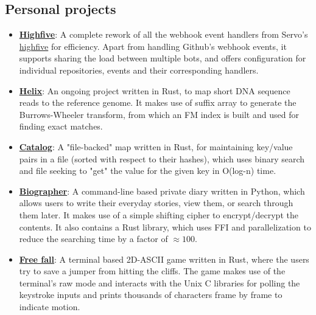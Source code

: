 \documentclass[11pt,a4paper,sans]{moderncv}        %
\newcommand\chref[3][linky]{\href{#2}{\color{#1}#3}}
\begin{document}
\subsection{Personal projects}
\begin{itemize}
\item \textbf{\chref{https://github.com/servo-automation/highfive}{Highfive}}: A complete rework of all the webhook event handlers from Servo's \chref{https://github.com/servo/highfive}{highfive} for efficiency. Apart from handling Github's webhook events, it supports sharing the load between multiple bots, and offers configuration for individual repositories, events and their corresponding handlers.
\item \textbf{\chref{https://github.com/Wafflespeanut/rust-helix}{Helix}}: An ongoing project written in Rust, to map short DNA sequence reads to the reference genome. It makes use of suffix array to generate the Burrows-Wheeler transform, from which an FM index is built and used for finding exact matches.
\item \textbf{\chref{https://github.com/Wafflespeanut/rust-catalog}{Catalog}}: A "file-backed" map written in Rust, for maintaining key/value pairs in a file (sorted with respect to their hashes), which uses binary search and file seeking to "get" the value for the given key in O(log-n) time.
\item \textbf{\chref{https://github.com/Wafflespeanut/biographer}{Biographer}}: A command-line based private diary written in Python, which allows users to write their everyday stories, view them, or search through them later. It makes use of a simple shifting cipher to encrypt/decrypt the contents. It also contains a Rust library, which uses FFI and parallelization to reduce the searching time by a factor of $\approx 100$.
\item \textbf{\chref{https://github.com/Wafflespeanut/free-fall}{Free fall}}: A terminal based 2D-ASCII game written in Rust, where the users try to save a jumper from hitting the cliffs. The game makes use of the terminal's raw mode and interacts with the Unix C libraries for polling the keystroke inputs and prints thousands of characters frame by frame to indicate motion.
\end{itemize}

\end{document}
